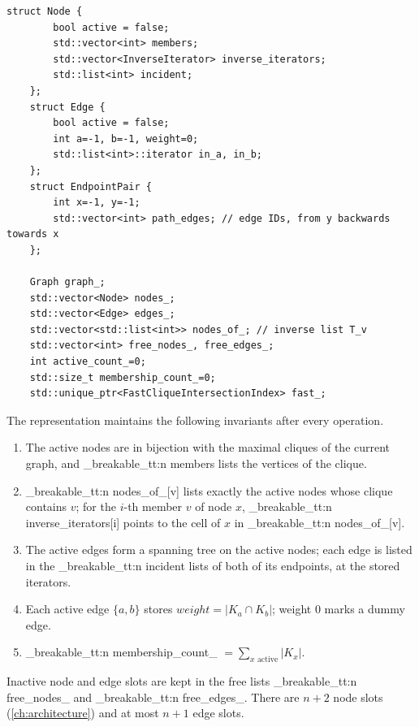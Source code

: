 \documentclass[11pt,a4paper,oneside]{report}
\theoremstyle{plain}
\theoremstyle{definition}
\theoremstyle{remark}
\DeclareRobustCommand{\code}[1]{\mtp_breakable_tt:n {#1}}
\DeclareRobustCommand{\file}[1]{\mtp_breakable_tt:n {#1}}
\begin{document}
\begin{lstlisting}[style=cpp,firstnumber=40,caption={\file{include/mtp/sparse_ibarra_a1.hpp}, lines 40--63: node, edge and member variables of A1.},label={lst:a1-members}]
    struct Node {
        bool active = false;
        std::vector<int> members;
        std::vector<InverseIterator> inverse_iterators;
        std::list<int> incident;
    };
    struct Edge {
        bool active = false;
        int a=-1, b=-1, weight=0;
        std::list<int>::iterator in_a, in_b;
    };
    struct EndpointPair {
        int x=-1, y=-1;
        std::vector<int> path_edges; // edge IDs, from y backwards towards x
    };

    Graph graph_;
    std::vector<Node> nodes_;
    std::vector<Edge> edges_;
    std::vector<std::list<int>> nodes_of_; // inverse list T_v
    std::vector<int> free_nodes_, free_edges_;
    int active_count_=0;
    std::size_t membership_count_=0;
    std::unique_ptr<FastCliqueIntersectionIndex> fast_;
\end{lstlisting}

\noindent The representation maintains the following invariants after every operation.
\begin{enumerate}[label=(I\arabic*)]
\item The active nodes are in bijection with the maximal cliques of the current graph, and
  \code{members} lists the vertices of the clique.
\item \code{nodes_of_[v]} lists exactly the active nodes whose clique contains \(v\); for the
  \(i\)-th member \(v\) of node \(x\), \code{inverse_iterators[i]} points to the cell of \(x\)
  in \code{nodes_of_[v]}.
\item The active edges form a spanning tree on the active nodes; each edge is listed in the
  \code{incident} lists of both of its endpoints, at the stored iterators.
\item Each active edge \(\{a,b\}\) stores \(\mathit{weight}=|K_a\cap K_b|\); weight 0 marks a
  dummy edge.
\item \code{membership_count_} \(=\sum_{x\text{ active}}|K_x|\).
\end{enumerate}
Inactive node and edge slots are kept in the free lists \code{free_nodes_} and
\code{free_edges_}. There are \(n+2\) node slots (\cref{ch:architecture}) and at most \(n+1\)
edge slots.
\end{document}
